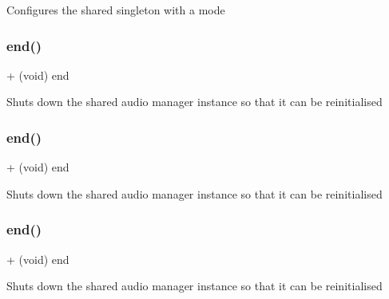 Configures the shared singleton with a mode \mbox{\label{interfaceCDAudioManager_a0d1e25778a1823456c3d65219a7d0562}} 
\subsubsection{\texorpdfstring{end()}{end()}\hspace{0.1cm}{\footnotesize\ttfamily [1/4]}}
{\footnotesize\ttfamily + (void) end \begin{DoxyParamCaption}{ }\end{DoxyParamCaption}}

Shuts down the shared audio manager instance so that it can be reinitialised \mbox{\label{interfaceCDAudioManager_a0d1e25778a1823456c3d65219a7d0562}} 
\subsubsection{\texorpdfstring{end()}{end()}\hspace{0.1cm}{\footnotesize\ttfamily [2/4]}}
{\footnotesize\ttfamily + (void) end \begin{DoxyParamCaption}{ }\end{DoxyParamCaption}}

Shuts down the shared audio manager instance so that it can be reinitialised \mbox{\label{interfaceCDAudioManager_a0d1e25778a1823456c3d65219a7d0562}} 
\subsubsection{\texorpdfstring{end()}{end()}\hspace{0.1cm}{\footnotesize\ttfamily [3/4]}}
{\footnotesize\ttfamily + (void) end \begin{DoxyParamCaption}{ }\end{DoxyParamCaption}}

Shuts down the shared audio manager instance so that it can be reinitialised \mbox{\label{interfaceCDAudioManager_a0d1e25778a1823456c3d65219a7d0562}} 
